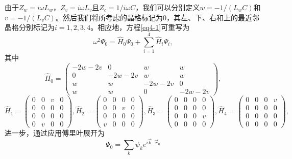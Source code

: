 由于$Z_w = i\omega L_w$，$Z_v = i\omega L_v$且$Z_c = 1/i\omega C$，我们可以分别定义$w = -1/(L_wC)$和$v = -1/(L_vC)$。然后我们将所考虑的晶格标记为0，其左、下、右和上的最近邻晶格分别标记为$i = 1,2,3,4$。相应地，方程\ref{eq4-1}可重写为
\begin{equation}\label{eq4-2}
    \omega^2\Psi_0 = \hat{H}_0\Psi_0 + \sum_{i = 1}^{4} \hat{H}_i\Psi_i, 
\end{equation}
其中
\begin{equation}\label{eq4-3}
    \hat{H}_0 = 
    \begin{pmatrix}
    -2w - 2v & 0 & w & w \\
    0 & -2w - 2v & w & w \\
    w & w & -2w - 2v & 0 \\
    w & w & 0 & -2w - 2v
    \end{pmatrix}, 
\end{equation}
\begin{equation}\label{eq4-4}
    \hat{H}_1 = 
    \begin{pmatrix}
    0 & 0 & v & 0 \\
    0 & 0 & 0 & 0 \\
    0 & 0 & 0 & 0 \\
    0 & v & 0 & 0
    \end{pmatrix},
    \hat{H}_2 = 
    \begin{pmatrix}
    0 & 0 & 0 & 0 \\
    0 & 0 & v & 0 \\
    0 & 0 & 0 & 0 \\
    v & 0 & 0 & 0
    \end{pmatrix},
    \hat{H}_3 = 
    \begin{pmatrix}
    0 & 0 & 0 & 0 \\
    0 & 0 & 0 & 0 \\
    0 & 0 & 0 & v \\
    0 & 0 & 0 & 0
    \end{pmatrix},
    \hat{H}_4 = 
    \begin{pmatrix}
    0 & 0 & 0 & v \\
    0 & 0 & 0 & 0 \\
    0 & 0 & 0 & 0 \\
    0 & 0 & 0 & 0
    \end{pmatrix}, 
\end{equation}
进一步，通过应用傅里叶展开为
\begin{equation}\label{eq4-5}
    \Psi_0 = \sum_{k} \psi_k e^{i\vec{k} \cdot \vec{r}_0}
\end{equation}
